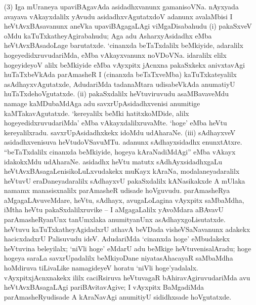 (3) Iga mUraneya upaviBAgavAda asidadhxvanunx gamanisoVNa. nAyxyada avayava vAkayxdalilx yAvudu asidadhxvAgutatxdoV adanunx avalaMbisi I heVtAvxBAsavanunx aneVka upaviBAgagaLAgi viMgaDisabahudu {\rm(i)} pakaSxveV oMdu kaTuTxkathe\-yAgira\-bahudu; Aga adu AsharxyAsidadhx eMba heVtAvxBAsadoLage barutatxde. `cinanxda beTaTx\-dalilx beMkiyide, adaralilx hogeyedidxruvudariMda, eMba vAkayxvanunx noVDoVNa. idaralilx elilx hogeyideyoV alilx beMkiyide eMba vAyxpitx jAcnxna pakaSxkekx anivxtavAgi huTaTxbeVkAda parAmasheR I (cinanxda beTaTxveMba) kaTuTxkateyalilx asAdhayxvAgutatxde, AdudariMda tadanaMtara udisabeVkAda anumatiyU huTaTxdehoVgutatxde. {\rm(ii)} pakaSx\-dalilx heVtuviruvudu asaMBavaveMdu namage kaMDubaMdAga adu savxrUpA\-sidadhxvenisi anu\-mitige kaMTakavAgutatxde. `kereyalilx beMki hatitxkoMDide, alilx hogeyedidxruvudariMda' eMba vAkayxdalilxruvaMte. `hoge' eMba heVtu kereyalilxradu. savxrUpA\-sidadhxkekx idoMdu udAharaNe. {\rm(iii)} sAdhayxveV asidadhxvenisuva heVtudoVSavuMTu. adanunx sAdhayx\-sidadhx enunxtAtxre. ``beTaTxdalilx cinanxda beMkiyide, hogeya kAraNadiMdAgi'' eMba vAkayx ida\-kokxMdu udAharaNe. asidadhx heVtu matutx sAdhAyxsidadhxgaLu heVtAvx\-BAsagaLenisikoLuLx\-vudakekx muKayx kAraNa, modalaneyadaralilx heVtuvU eraDaneyadaralilx sAdhayxvU pakaSx\-dalilx kANasikakxde A mUlaka namamx manasisxnalilx parAmasheR udisade hoVguvudu. parAmasheRya aMgagaLAvuveMdare, heVtu, sAdhayx, avugaLoLagina vAyxpitx saMbaMdha, iMtha heVtu pakaSxdalilxruvike -- I aMgagaLalilx yAvoMdara aBAvavU parAmasheR\-yanUnx tanUmxlaka anumityanUnx asAdhayxgoLisutatxde. heVtuvu kaTuTxkatheyAgi\-dadxrU athavA beVDada visheVSaNavanunx adakekx hacicxdadxrU Palisuvudu ideV. AdudariMda `cinanxda hoge' eMbudakekx heVtuvina beleyilalx; `niVli hoge' eMdarU adu beMkige heVtuvenisalAradu; hoge hogeya saraLa savxrUpadalilx beMkiyoDane niyata\-sAhacayaR saMbaMdha hoMdiruva tiLivaLike namagideyeV horatu `niVli hoge'yadalalx. vAyxpitxjAcnxnakekx ililx caciRsiruva heVtuvagaR bAhiravAgiruvudariMda avu heVtAvxBAsagaLAgi pariBAvitavAgive; I vAyxpitx BaMgadiMda parAmasheRyudisade A kAraNavAgi anumitiyU sididhxsade hoVgutatxde.


